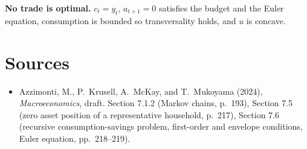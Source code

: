 \documentclass[12pt]{article}
\begin{document}
\textbf{No trade is optimal.} $c_t=y_t$, $a_{t+1}=0$ satisfies the budget
and the Euler equation, consumption is bounded so transversality holds, and
$u$ is concave.

\section*{Sources}

\begin{itemize}\itemsep2pt
\item Azzimonti, M., P.\ Krusell, A.\ McKay, and T.\ Mukoyama (2024),
  \emph{Macroeconomics}, draft. Section 7.1.2 (Markov chains, p.\ 193),
  Section 7.5 (zero asset position of a representative household, p.\ 217),
  Section 7.6 (recursive consumption-savings problem, first-order and
  envelope conditions, Euler equation, pp.\ 218--219).
\end{itemize}
\end{document}
